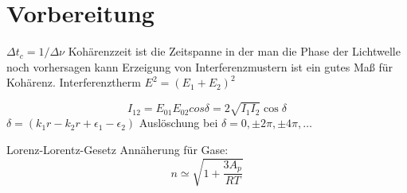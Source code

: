 \section{Vorbereitung}
$\Delta t_c  = 1/ \Delta \nu$
Kohärenzzeit ist die Zeitspanne in der man die Phase der Lichtwelle noch vorhersagen kann
Erzeigung von Interferenzmustern ist ein gutes Maß für Kohärenz.
Interferenztherm
$E^2 = (E_1 +E_2)^2$

$$I_{12} = E_{01}E_{02}cos{\delta} = 2 \sqrt{I_1 I_2} \cos{\delta}$$
$\delta = (k_1 r- k_2 r + \epsilon_1-\epsilon_2)$
Auslöschung bei $\delta= 0, \pm 2\pi,\pm4\pi,\dots$

Lorenz-Lorentz-Gesetz
Annäherung für Gase:
$$n \simeq \sqrt{1 + \frac{3A_p}{R T}} $$

